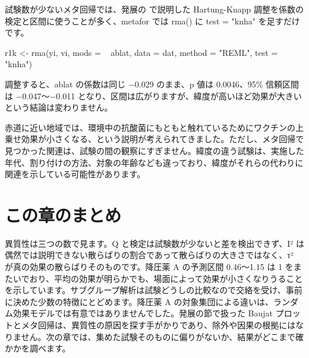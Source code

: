 試験数が少ないメタ回帰では、発展の  で説明した Hartung-Knapp 調整を係数の検定と区間に使うことが多く、metafor では rma() に test = "knha" を足すだけです。

\begin{rcode}
r1k <- rma(yi, vi, mods = ~ ablat, data = dat,
           method = "REML", test = "knha")
\end{rcode}

調整すると、ablat の係数は同じ −0.029 のまま、p 値は 0.0046、95\% 信頼区間は −0.047〜−0.011 となり、区間は広がりますが、緯度が高いほど効果が大きいという結論は変わりません。


赤道に近い地域では、環境中の抗酸菌にもともと触れているためにワクチンの上乗せ効果が小さくなる、という説明が考えられてきました。ただし、メタ回帰で見つかった関連は、試験の間の観察にすぎません。緯度の違う試験は、実施した年代、割り付けの方法、対象の年齢なども違っており、緯度がそれらの代わりに関連を示している可能性があります。

\section{この章のまとめ}
\label{sec:06-6}

異質性は三つの数で見ます。Q と検定は試験数が少ないと差を検出できず、I² は偶然では説明できない散らばりの割合であって散らばりの大きさではなく、τ² が真の効果の散らばりそのものです。降圧薬 A の予測区間 0.46〜1.15 は 1 をまたいでおり、平均の効果が明らかでも、場面によって効果が小さくなりうることを示しています。サブグループ解析は試験どうしの比較なので交絡を受け、事前に決めた少数の特徴にとどめます。降圧薬 A の対象集団による違いは、ランダム効果モデルでは有意ではありませんでした。発展の節で扱った Baujat プロットとメタ回帰は、異質性の原因を探す手がかりであり、除外や因果の根拠にはなりません。次の章では、集めた試験そのものに偏りがないか、結果がどこまで確かかを調べます。
